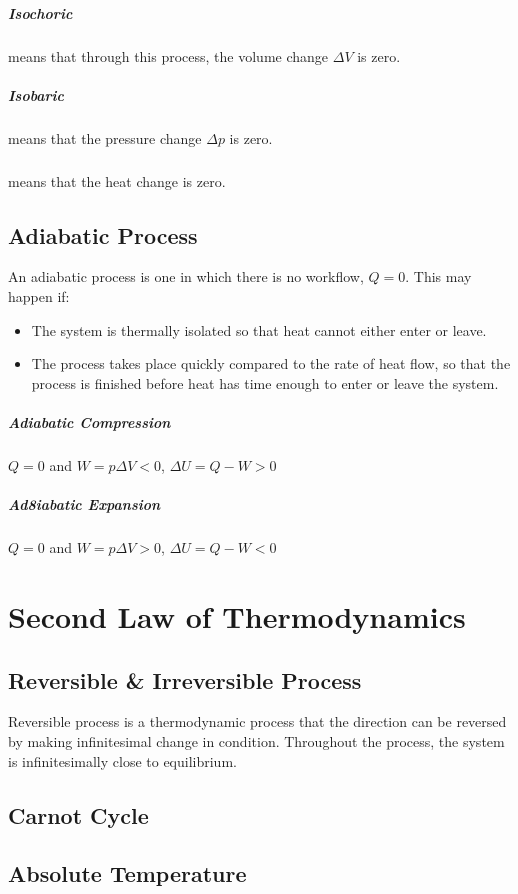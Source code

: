 \documentclass{note}
\begin{document}
\paragraph{Isochoric} means that through this process, the volume change $\Delta V$ is zero.

\paragraph{Isobaric} means that the pressure change $\Delta p$ is zero.

\paragraph{} means that the heat change is zero.

\section{Adiabatic Process} 
An adiabatic process is one in which there is no workflow, $Q = 0$. This may happen if: 
\begin{itemize}
    \item The system is thermally isolated so that heat cannot either enter or leave.
    \item The process takes place quickly compared to the rate of heat flow, so that the process is finished before heat has time enough to enter or leave the system.
\end{itemize}

\paragraph{Adiabatic Compression}
\(Q = 0\) and \(W = p\Delta V < 0\), \(\Delta U = Q - W > 0\)

\paragraph{Ad8iabatic Expansion}
\(Q = 0\) and \(W = p\Delta V > 0\), \(\Delta U = Q - W < 0\)

\chapter{Second Law of Thermodynamics}

\section{Reversible \& Irreversible Process}

Reversible process is a thermodynamic process that the direction can be reversed by making infinitesimal change in condition. Throughout the process, the system is infinitesimally close to equilibrium.

\section{Carnot Cycle}

\section{Absolute Temperature}
\end{document}
